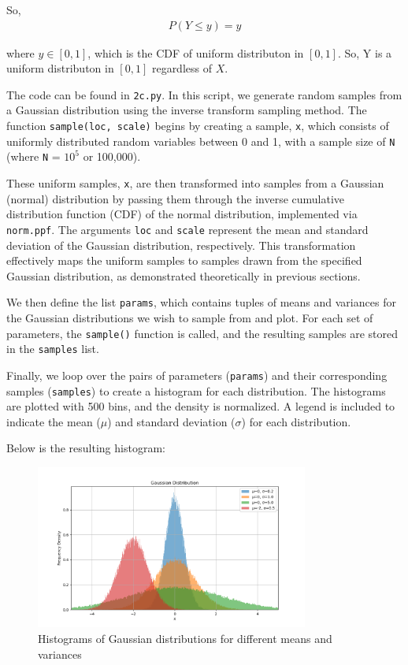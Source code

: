 \begin{solution}
	So,
	\begin{align}
		P(Y\leq y) = y
	\end{align}

	where $y\in [0,1]$, which is the CDF of uniform distributon in $[0,1]$.
	So, Y is a uniform distributon in $[0,1]$ regardless of $X$.



	The code can be found in \texttt{2c.py}. In this script, we generate random samples from a Gaussian distribution using the inverse transform sampling method. The function \texttt{sample(loc, scale)} begins by creating a sample, \texttt{x}, which consists of uniformly distributed random variables between 0 and 1, with a sample size of \texttt{N} (where \texttt{N} = $10^5$ or 100,000).

	These uniform samples, \texttt{x}, are then transformed into samples from a Gaussian (normal) distribution by passing them through the inverse cumulative distribution function (CDF) of the normal distribution, implemented via \texttt{norm.ppf}. The arguments \texttt{loc} and \texttt{scale} represent the mean and standard deviation of the Gaussian distribution, respectively. This transformation effectively maps the uniform samples to samples drawn from the specified Gaussian distribution, as demonstrated theoretically in previous sections.

	We then define the list \texttt{params}, which contains tuples of means and variances for the Gaussian distributions we wish to sample from and plot. For each set of parameters, the \texttt{sample()} function is called, and the resulting samples are stored in the \texttt{samples} list.

	Finally, we loop over the pairs of parameters (\texttt{params}) and their corresponding samples (\texttt{samples}) to create a histogram for each distribution. The histograms are plotted with 500 bins, and the density is normalized. A legend is included to indicate the mean (\texttt{$\mu$}) and standard deviation (\texttt{$\sigma$}) for each distribution.

	Below is the resulting histogram:
	\begin{figure}[H]
		\centering
		\includegraphics[width=0.8\textwidth]{../images/2c.png}
		\caption{Histograms of Gaussian distributions for different means and variances}
		\label{fig:gaussian_hist}
	\end{figure}
	

\end{solution}
